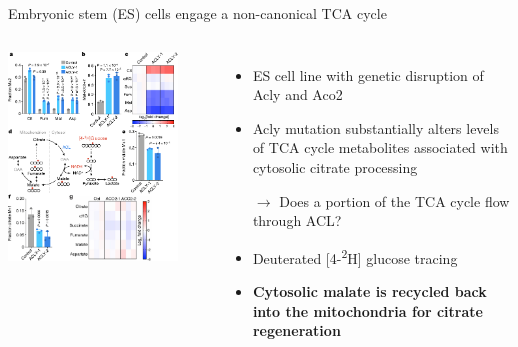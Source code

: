 \documentclass[10pt, aspectratio=169]{beamer}
\begin{document}
\begin{frame}{Embryonic stem (ES) cells engage a non-canonical TCA cycle}

\begin{columns}			
\centering
\includegraphics[width=0.85\textwidth]{figures/Arnold_2022_fig2_mod.pdf}


\begin{itemize}
    \item ES cell line with genetic disruption of Acly and Aco2 \\[0.2cm]
    \item Acly mutation substantially alters levels of TCA cycle metabolites associated with cytosolic citrate processing\\[0.5cm]
    \pause
    \item[$\rightarrow$] Does a portion of the TCA cycle flow through ACL?\\[0.2cm]
    \pause
    \item Deuterated [4-\textsuperscript{2}H] glucose tracing\\[0.2cm]
    \pause
    \item \textbf{Cytosolic malate is recycled back into the mitochondria for citrate regeneration}
\end{itemize}
\end{columns}

\end{frame}
\end{document}
